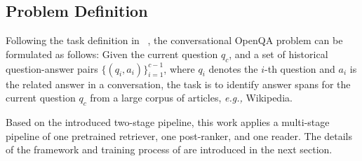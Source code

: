 \vspace{-0.05in}
\subsection{Problem Definition}
Following the task definition in ~\cite{qu2020open}, the conversational OpenQA problem can be formulated as follows: Given the current question $q_c$, and a set of historical question-answer pairs $\{(q_i, a_i)\}^{c-1}_{i=1}$, where $q_i$ denotes the $i$-th question and $a_i$ is the related answer in a conversation, the task is to identify answer spans for the current question $q_c$ from a large corpus of articles, \emph{e.g.,} Wikipedia.

Based on the introduced two-stage pipeline, this work applies a multi-stage pipeline of one pretrained retriever, one post-ranker, and one reader. The details of the framework and training process of {\modelname} are introduced in the next section.
